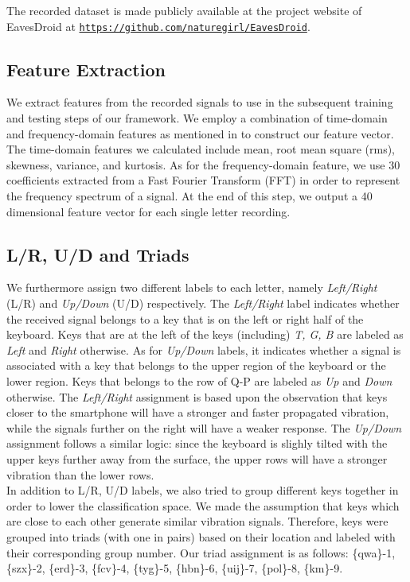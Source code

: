 \documentclass[11pt,conference]{IEEEtran}
\begin{document}
The recorded dataset is made publicly available at the project website of EavesDroid at \texttt{\url{https://github.com/naturegirl/EavesDroid}}.

\subsection{Feature Extraction}
\label{sec:feature-extractor}
We extract features from the recorded signals to use in the subsequent training and testing steps of our framework. We employ a combination of time-domain and frequency-domain features as mentioned in \cite{spiphone} to construct our feature vector. The time-domain features we calculated include mean, root mean square (rms), skewness, variance, and kurtosis. As for the frequency-domain feature, we use 30 coefficients extracted from a Fast Fourier Transform (FFT) in order to represent the frequency spectrum of a signal. At the end of this step, we output a 40 dimensional feature vector for each single letter recording.

\subsection{L/R, U/D and Triads}
\label{sec:labeler}
We furthermore assign two different labels to each letter, namely \emph{Left/Right} (L/R) and \emph{Up/Down} (U/D) respectively. The \emph{Left/Right} label indicates whether the received signal belongs to a key that is on the left or right half of the keyboard. Keys that are at the left of the keys (including) \emph{T, G, B} are labeled as \emph{Left} and \emph{Right} otherwise. As for \emph{Up/Down} labels, it indicates whether a signal is associated with a key that belongs to the upper region of the keyboard or the lower region. Keys that belongs to the row of Q-P are labeled as \emph{Up} and \emph{Down} otherwise. The \emph{Left/Right} assignment is based upon the observation that keys closer to the smartphone will have a stronger and faster propagated vibration, while the signals further on the right will have a weaker response. The \emph{Up/Down} assignment follows a similar logic: since the keyboard is slighly tilted with the upper keys further away from the surface, the upper rows will have a stronger vibration than the lower rows.\\

In addition to L/R, U/D labels, we also tried to group different keys together in order to lower the classification space. We made the assumption that keys which are close to each other generate similar vibration signals. Therefore, keys were grouped into triads (with one in pairs) based on their location and labeled with their corresponding group number.
Our triad assignment is as follows:
\{qwa\}-1, \{szx\}-2, \{erd\}-3, \{fcv\}-4, \{tyg\}-5, \{hbn\}-6, \{uij\}-7, \{pol\}-8, \{km\}-9.
\end{document}
